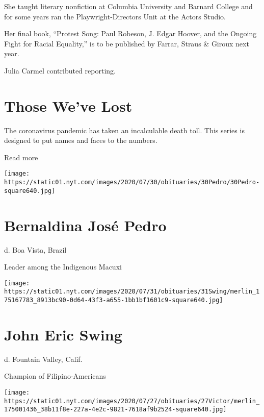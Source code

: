 She taught literary nonfiction at Columbia University and Barnard
College and for some years ran the Playwright-Directors Unit at the
Actors Studio.

Her final book, ``Protest Song: Paul Robeson, J. Edgar Hoover, and the
Ongoing Fight for Racial Equality,'' is to be published by Farrar,
Straus \& Giroux next year.

Julia Carmel contributed reporting.

\href{https://www.nytimes.com/interactive/2020/obituaries/people-died-coronavirus-obituaries.html?action=click\&pgtype=Article\&state=default\&region=BELOW_MAIN_CONTENT\&context=covid_obits_promo}{}

\hypertarget{those-weve-lost}{%
\section{Those We've Lost}\label{those-weve-lost}}

The coronavirus pandemic has taken an incalculable death toll. This
series is designed to put names and faces to the numbers.

Read more

\texttt{[image: https://static01.nyt.com/images/2020/07/30/obituaries/30Pedro/30Pedro-square640.jpg]}

\hypertarget{bernaldina-josuxe9-pedro}{%
\section{Bernaldina José Pedro}\label{bernaldina-josuxe9-pedro}}

d. Boa Vista, Brazil

Leader among the Indigenous Macuxi

\texttt{[image: https://static01.nyt.com/images/2020/07/31/obituaries/31Swing/merlin\_175167783\_8913bc90-0d64-43f3-a655-1bb1bf1601c9-square640.jpg]}

\hypertarget{john-eric-swing}{%
\section{John Eric Swing}\label{john-eric-swing}}

d. Fountain Valley, Calif.

Champion of Filipino-Americans

\texttt{[image: https://static01.nyt.com/images/2020/07/27/obituaries/27Victor/merlin\_175001436\_38b11f8e-227a-4e2c-9821-7618af9b2524-square640.jpg]}

